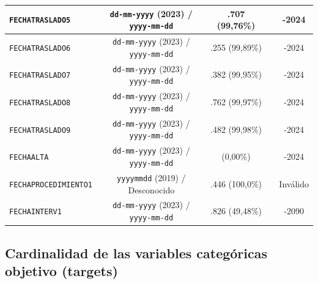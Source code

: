 \begin{table}[htbp]
\begin{tabular}{|l|c|c|c|c|}
\parbox[t]{2.8cm}{\texttt{FECHATRASLADO5}} & \parbox[t]{3.6cm}{\centering \texttt{dd-mm-yyyy} (2023) / \texttt{yyyy-mm-dd}} & \parbox[t]{2.2cm}{.707 (99,76\%)} & \parbox[t]{1.3cm}{} & \parbox[t]{1.8cm}{-2024} \\ \hline
\parbox[t]{2.8cm}{\texttt{FECHATRASLADO6}} & \parbox[t]{3.6cm}{\centering \texttt{dd-mm-yyyy} (2023) / \texttt{yyyy-mm-dd}} & \parbox[t]{2.2cm}{.255 (99,89\%)} & \parbox[t]{1.3cm}{} & \parbox[t]{1.8cm}{-2024} \\ \hline
\parbox[t]{2.8cm}{\texttt{FECHATRASLADO7}} & \parbox[t]{3.6cm}{\centering \texttt{dd-mm-yyyy} (2023) / \texttt{yyyy-mm-dd}} & \parbox[t]{2.2cm}{.382 (99,95\%)} & \parbox[t]{1.3cm}{} & \parbox[t]{1.8cm}{-2024} \\ \hline
\parbox[t]{2.8cm}{\texttt{FECHATRASLADO8}} & \parbox[t]{3.6cm}{\centering \texttt{dd-mm-yyyy} (2023) / \texttt{yyyy-mm-dd}} & \parbox[t]{2.2cm}{.762 (99,97\%)} & \parbox[t]{1.3cm}{} & \parbox[t]{1.8cm}{-2024} \\ \hline
\parbox[t]{2.8cm}{\texttt{FECHATRASLADO9}} & \parbox[t]{3.6cm}{\centering \texttt{dd-mm-yyyy} (2023) / \texttt{yyyy-mm-dd}} & \parbox[t]{2.2cm}{.482 (99,98\%)} & \parbox[t]{1.3cm}{} & \parbox[t]{1.8cm}{-2024} \\ \hline
\parbox[t]{2.8cm}{\texttt{FECHAALTA}} & \parbox[t]{3.6cm}{\centering \texttt{dd-mm-yyyy} (2023) / \texttt{yyyy-mm-dd}} & \parbox[t]{2.2cm}{ (0,00\%)} & \parbox[t]{1.3cm}{} & \parbox[t]{1.8cm}{-2024} \\ \hline
\parbox[t]{2.8cm}{\texttt{FECHAPROCEDIMIENTO1}} & \parbox[t]{3.6cm}{\centering \texttt{yyyymmdd} (2019) / Desconocido} & \parbox[t]{2.2cm}{.446 (100,0\%)} & \parbox[t]{1.3cm}{} & \parbox[t]{1.8cm}{\centering Inválido} \\ \hline
\parbox[t]{2.8cm}{\texttt{FECHAINTERV1}} & \parbox[t]{3.6cm}{\centering \texttt{dd-mm-yyyy} (2023) / \texttt{yyyy-mm-dd}} & \parbox[t]{2.2cm}{.826 (49,48\%)} & \parbox[t]{1.3cm}{} & \parbox[t]{1.8cm}{-2090} \\ \hline
\end{tabular}
\end{table}

\subsection{Cardinalidad de las variables categóricas objetivo (targets)}

